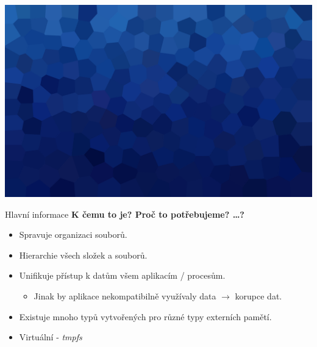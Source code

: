 \documentclass[aspectratio=169,xcolor=dvipsnames, t]{beamer}
\begin{document}
{
{
    \includegraphics[width=\paperwidth,height=\paperheight]{AICStyleData/logos/mene_polygonu_bg.png}
}
\begin{frame}{Hlavní informace}
    \textbf{\large K čemu to je? Proč to potřebujeme? \dots ?}
        \begin{itemize}
            \item Spravuje organizaci souborů.
            \item Hierarchie všech složek a souborů.
            \item Unifikuje přístup k datům všem aplikacím / procesům.
            \begin{itemize}
                \item Jinak by aplikace nekompatibilně využívaly data $\rightarrow$ korupce dat.
            \end{itemize}
            \item Existuje mnoho typů vytvořených pro různé typy externích pamětí.
            \item Virtuální - \emph{tmpfs}
        \end{itemize}
\end{frame}
}
\end{document}
